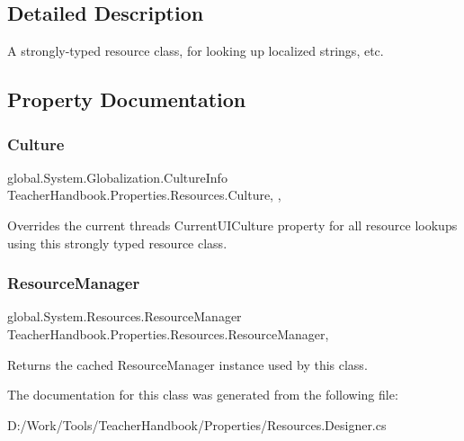 \subsection{Detailed Description}
A strongly-\/typed resource class, for looking up localized strings, etc. 



\subsection{Property Documentation}
\mbox{\label{class_teacher_handbook_1_1_properties_1_1_resources_a7d2a69e42deca52f95de104f0283705c}} 
\subsubsection{\texorpdfstring{Culture}{Culture}}
{\footnotesize\ttfamily global.\+System.\+Globalization.\+Culture\+Info Teacher\+Handbook.\+Properties.\+Resources.\+Culture\hspace{0.3cm}{\ttfamily [static]}, {\ttfamily [get]}, {\ttfamily [set]}}



Overrides the current thread\textquotesingle{}s Current\+U\+I\+Culture property for all resource lookups using this strongly typed resource class. 

\mbox{\label{class_teacher_handbook_1_1_properties_1_1_resources_a21ca51d6f85c0dfdff618767488d942f}} 
\subsubsection{\texorpdfstring{Resource\+Manager}{ResourceManager}}
{\footnotesize\ttfamily global.\+System.\+Resources.\+Resource\+Manager Teacher\+Handbook.\+Properties.\+Resources.\+Resource\+Manager\hspace{0.3cm}{\ttfamily [static]}, {\ttfamily [get]}}



Returns the cached Resource\+Manager instance used by this class. 



The documentation for this class was generated from the following file\+:\begin{DoxyCompactItemize}
\item 
D\+:/\+Work/\+Tools/\+Teacher\+Handbook/\+Properties/Resources.\+Designer.\+cs\end{DoxyCompactItemize}
